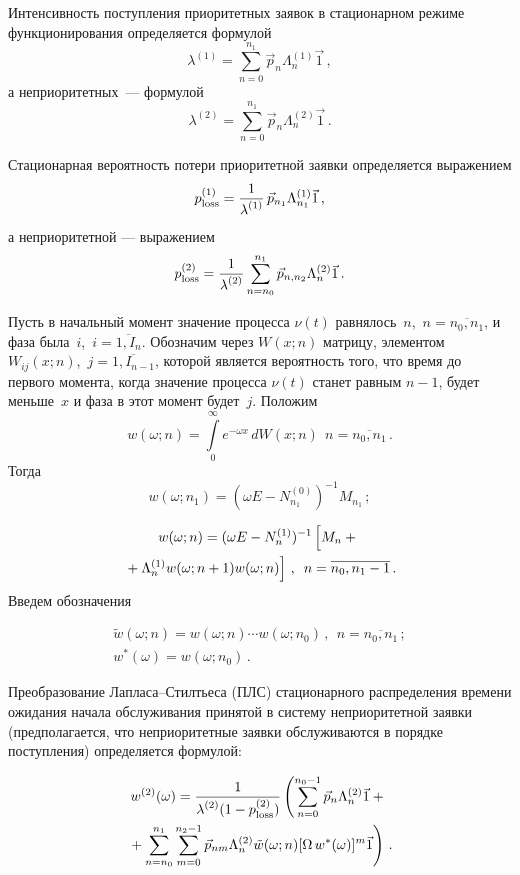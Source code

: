 \begin{multicols}{2}
Интенсивность поступления приоритетных заявок в стационарном
режиме функционирования определяется формулой
$$
\lambda^{(1)}
=
\sum\limits_{n=0}^{n_1} \vec p_{n} \Lambda_n^{(1)} \vec 1\,,
$$
а неприоритетных~--- формулой
$$
\lambda^{(2)} = \sum\limits_{n=0}^{n_1} \vec p_{n} \Lambda_n^{(2)} \vec 1\,.
$$

Стационарная вероятность потери приоритетной заявки определяется
выражением
$$
p^{(1)}_{\mathrm{loss}} = \displaystyle\frac{\displaystyle 1\mathstrut}{\displaystyle \lambda^{(1)}\mathstrut}\,
\vec p_{n_1} \Lambda_{n_1}^{(1)} \vec 1\,,
$$
а неприоритетной --- выражением
$$
p^{(2)}_{\mathrm{loss}} = \displaystyle\frac{\displaystyle 1\mathstrut}{\displaystyle \lambda^{(2)}\mathstrut} \sum_{n=n_0}^{n_1} \vec p_{n,n_2} \Lambda_{n}^{(2)} \vec 1\,.
$$

Пусть в начальный момент значение процесса $\nu(t)$ равнялось~$n$,\  
$n=\overline{n_0,n_1}$, и фаза была~$i$,\ $i=\overline{1,I_{n}}$.
Обозначим через $W(x;n)$ мат\-ри\-цу, элементом
$W_{ij}(x;n)$,\ $j=\overline{1,I_{n-1}}$, которой является
вероятность того, что время до первого момента, когда
значение процесса $\nu(t)$ станет равным $n-1$, будет меньше~$x$
и фаза в этот момент будет~$j$.
Положим
$$
w(\omega;n) = \int\limits_0^\infty e^{-\omega x}\, dW(x;n)
\ \ n=\overline{n_0,n_1}\,.
$$
Тогда
$$
w(\omega;n_1) = (\omega E - N_{n_1}^{(0)})^{-1} M_{n_1}\,;
$$

\vspace*{-12pt}

\noindent
\begin{multline*}
w(\omega;n) = (\omega E - N_{n}^{(1)})^{-1}
\left[\vphantom{\Lambda_n^{(1)}}
M_{n} +{}\right.\\
\left.{}+ \Lambda_n^{(1)} w(\omega;n+1) w(\omega;n)\right]\,,\enskip
n=\overline{n_0,n_1-1}\,.
\end{multline*}
Введем обозначения

\noindent
\begin{gather*}
\tilde w(\omega;n) = w(\omega;n) \cdots w(\omega;n_0)\,,
\ \ n=\overline{n_0,n_1}\,;
\\
w^*(\omega) = w(\omega;n_0)\,.
\end{gather*}

Преобразование Лап\-ла\-са--Стилтье\-са (ПЛС) стационарного распределения
времени ожидания начала обслуживания принятой в систему неприоритетной
заявки (предполагается, что неприоритетные заявки
обслуживаются в порядке поступления)
определяется формулой:

\noindent
\begin{multline*}
w^{(2)}(\omega) = \displaystyle\frac{\displaystyle 1\mathstrut}{\displaystyle \lambda^{(2)}(1-p^{(2)}_{\mathrm{loss}})
\mathstrut}
\left(
\sum_{n=0}^{n_0-1} \vec p_{n} \Lambda_n^{(2)} \vec 1 +{}\right.\\
\left.{}+
\sum_{n=n_0}^{n_1} \sum_{m=0}^{n_2-1}
\vec p_{nm} \Lambda_n^{(2)} \tilde w(\omega;n) [\Omega\, w^*(\omega)]^m
\vec 1 \right)\,.
\end{multline*}


\end{multicols}
